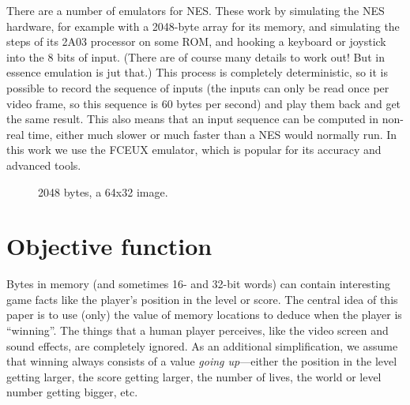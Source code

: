 \documentclass[twocolumn]{article}
\begin{document}
There are a number of emulators for NES. These work by simulating the NES hardware, for example with a 2048-byte array for its memory, and simulating the steps of its 2A03 processor on some ROM, and hooking a keyboard or joystick into the 8 bits of input. (There are of course many details to work out! But in essence emulation is jut that.) This process is completely deterministic, so it is possible to record the sequence of inputs (the inputs can only be read once per video frame, so this sequence is 60  bytes per second) and play them back and get the same result. This also means that an input sequence can be computed in non-real time, either much slower or much faster than a NES would normally run. In this work we use the FCEUX emulator, which is popular for its accuracy and advanced tools.

\begin{figure}
\begin{center}
\end{center}\vspace{-0.1in}
\caption{2048 bytes, a 64x32 image.}
\label{fig:bytes2048}
\end{figure}

\section{Objective function}

Bytes in memory (and sometimes 16- and 32-bit words) can contain interesting game facts like the player's position in the level or score. The central idea of this paper is to use (only) the value of memory locations to deduce when the player is ``winning''. The things that a human player perceives, like the video screen and sound effects, are completely ignored. As an additional simplification, we assume that winning always consists of a value {\it going up}---either the position in the level getting larger, the score getting larger, the number of lives, the world or level number getting bigger, etc.
\end{document}
